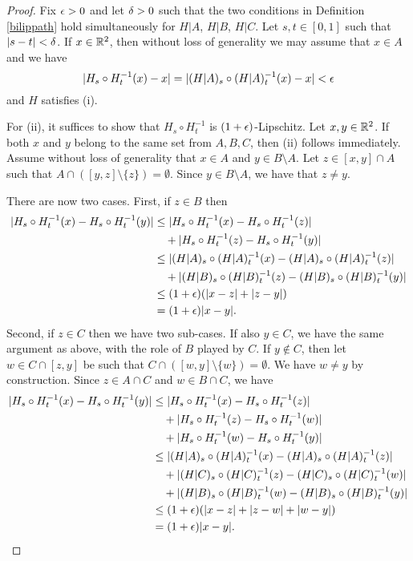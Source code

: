\documentclass{amsart}
\begin{document}
\begin{proof}
Fix $\epsilon>0$ and let $\delta>0$ such that  the two conditions in Definition \ref{bilippath} hold simultaneously for $H|A$, $H|B$, $H|C$. Let $s,t \in [0,1]$ such that $|s-t|<\delta$. If $x\in \mathbb{R}^2$, then without loss of generality we may assume that $x\in A$ and we have
\[ |H_s \circ H_t^{-1}(x) - x| = |(H|A)_s \circ (H|A)_t^{-1}(x) - x| < \epsilon\]
and $H$ satisfies (i). 

For (ii), it suffices to show that $H_s\circ H_t^{-1}$ is $(1+\epsilon)$-Lipschitz. Let $x,y \in \mathbb{R}^2$. If both $x$ and $y$ belong to the same set from $A,B,C$, then (ii) follows immediately. Assume without loss of generality that $x\in A$ and $y\in B\setminus A$. Let $z \in [x,y] \cap A$ such that $A\cap ([y,z] \setminus \{z\}) = \emptyset$. Since $y\in B\setminus A$, we have that $z\neq y$. 

There are now two cases. First, if $z\in B$ then
\begin{align*}
|H_{s} \circ H_{t}^{-1}(x) -H_{s} \circ H_{t}^{-1}(y) |&\leq   |H_{s} \circ H_{t}^{-1}(x) -H_{s} \circ H_{t}^{-1}(z) |\\
&\quad +  |H_{s} \circ H_{t}^{-1}(z) -H_{s} \circ H_{t}^{-1}(y) |\\  
&\leq   |(H|A)_{s} \circ (H|A)_{t}^{-1}(x) -(H|A)_{s} \circ (H|A)_{t}^{-1}(z) |\\
&\quad +  |(H|B)_{s} \circ (H|B)_{t}^{-1}(z) -(H|B)_{s} \circ (H|B)_{t}^{-1}(y) |\\
&\leq (1+\epsilon)(|x-z| + |z-y|)\\
&= (1+\epsilon)|x-y|.
\end{align*}
Second, if $z\in C$ then we have two sub-cases. If also $y\in C$, we have the same argument as above, with the role of $B$ played by $C$. If $y\notin C$, then let $w\in C\cap [z,y] $ be such that $C\cap ( [w,y] \setminus  \{ w \} ) = \emptyset$. We have $w\neq y$ by construction. Since $z\in A\cap C$ and $w \in B\cap C$, we have
\begin{align*} 
|H_{s} \circ H_{t}^{-1}(x) -H_{s} \circ H_{t}^{-1}(y) | &\leq   |H_{s} \circ H_{t}^{-1}(x) -H_{s} \circ H_{t}^{-1}(z) |\\
&\quad +  |H_{s} \circ H_{t}^{-1}(z) -H_{s} \circ H_{t}^{-1}(w) |\\  
&\quad +  |H_{s} \circ H_{t}^{-1}(w) -H_{s} \circ H_{t}^{-1}(y) |\\
 &\leq   |(H|A)_{s} \circ (H|A)_{t}^{-1}(x) -(H|A)_{s} \circ (H|A)_{t}^{-1}(z) |\\
&\quad +  |(H|C)_{s} \circ (H|C)_{t}^{-1}(z) -(H|C)_{s} \circ (H|C)_{t}^{-1}(w) |\\  
&\quad +  |(H|B)_{s} \circ (H|B)_{t}^{-1}(w) -(H|B)_{s} \circ (H|B)_{t}^{-1}(y) |\\
&\leq (1+\epsilon)(|x-z| + |z-w| + |w-y|)\\
&= (1+\epsilon)|x-y|.\qedhere
\end{align*}
\end{proof}
\end{document}
